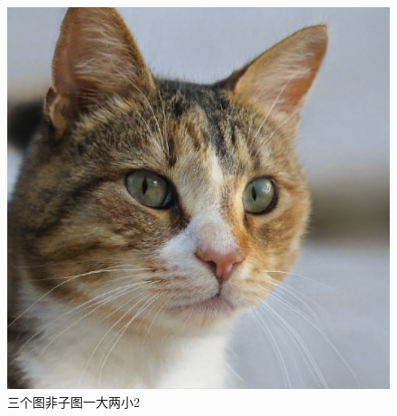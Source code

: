 \documentclass[12pt,a4paper,UTF8]{article}
\begin{document}
\begin{figure}[!htbp]
\begin{minipage}[b]{0.45\textwidth}
        \end{minipage}
        \hspace{0.5cm}%
        \begin{minipage}[b]{0.4\textwidth}
            \begin{minipage}[b]{\textwidth}
                \centering
                \includegraphics[width=\textwidth]{example}
                \caption{三个图非子图一大两小2}
                 

\end{minipage}
\end{minipage}
\end{figure}
\end{document}
